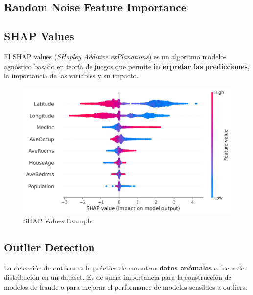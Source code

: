 \subsection{Random Noise Feature Importance}

\subsection{SHAP Values}
\label{subsec:shap_values}

El SHAP values (\textit{SHapley Additive exPlanations}) es un algoritmo modelo-agnóstico basado en teoría de juegos que permite \textbf{interpretar las predicciones}, la importancia de las variables y su impacto.

\begin{figure}[H]
    \center
    \includegraphics[scale=0.55]{notebooks/Others/img/shap_values_example.png}
    \caption{SHAP Values Example}
\end{figure}

\subsection{Outlier Detection}

La detección de outliers es la práctica de encontrar \textbf{datos anómalos} o fuera de distribución en un dataset. Es de suma importancia para la construcción de modelos de fraude o para mejorar el performance de modelos sensibles a outliers.

